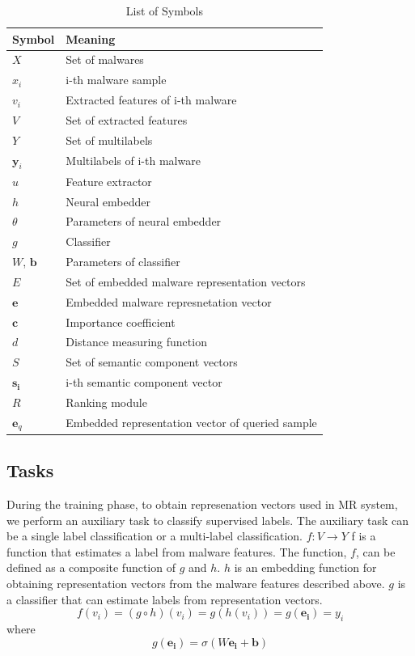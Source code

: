 \begin{table}[!htb] %
\caption{List of Symbols}
\label{tab:notation}
\begin{minipage}{\columnwidth}
\begin{center}
\begin{tabular}{ll}
\toprule
Symbol & Meaning\\
\midrule
  $X$ & Set of malwares \\
  $x_i$ & i-th malware sample \\
  $v_i$ & Extracted features of i-th malware\\
  $V$ & Set of extracted features \\
  $Y$ & Set of multilabels  \\
  $\mathbf{y}_{i}$ & Multilabels of i-th malware\\
  $u$ & Feature extractor \\
  $h$ & Neural embedder \\
  $\theta$ & Parameters of neural embedder \\
  $g$ & Classifier \\   
  $W$, $\mathbf{b}$ & Parameters of classifier \\  
  $E$ & Set of embedded malware representation vectors \\
  $\mathbf{e}$ & Embedded malware represnetation vector \\
  $\mathbf{c}$ & Importance coefficient \\
  $d$ & Distance measuring function \\
  $S$ & Set of semantic component vectors \\
  $\mathbf{s_i}$ & i-th semantic component vector \\
  $R$ & Ranking module \\
  $\mathbf{e}_q$ & Embedded representation vector of queried sample \\
  
\bottomrule
\end{tabular}
\end{center}
\bigskip\centering
\end{minipage}
\end{table}


\subsection{Tasks}
During the training phase, to obtain represenation vectors used in MR system, we perform an auxiliary task to classify supervised labels. The auxiliary task can be a single label classification or a multi-label classification. $f: V \rightarrow Y $ f is a function that estimates a label from malware features. The function, $f$, can be defined as a composite function of $g$ and $h$. $h$ is an embedding function for obtaining representation vectors from the malware features described above. $g$ is a classifier that can estimate labels from representation vectors. 
\[
f(v_i) = (g \circ h)(v_i) = g(h(v_i)) = g(\mathbf{e_i}) = y_i 
\]
where
\[
g(\mathbf{e_i}) = \sigma (W\mathbf{e_i} + \mathbf{b}) 
\]

